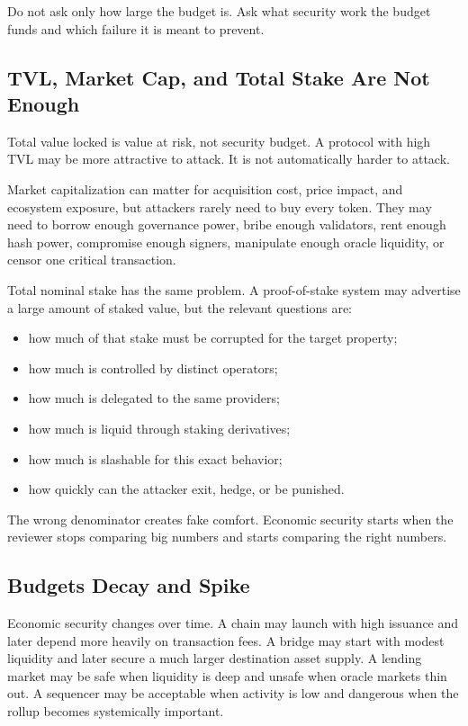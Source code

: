 Do not ask only how large the budget is. Ask what security work the budget funds and which failure it is meant to prevent.

\subsection{TVL, Market Cap, and Total Stake Are Not Enough}

Total value locked is value at risk, not security budget. A protocol with high TVL may be more attractive to attack. It is not automatically harder to attack.

Market capitalization can matter for acquisition cost, price impact, and ecosystem exposure, but attackers rarely need to buy every token. They may need to borrow enough governance power, bribe enough validators, rent enough hash power, compromise enough signers, manipulate enough oracle liquidity, or censor one critical transaction.

Total nominal stake has the same problem. A proof-of-stake system may advertise a large amount of staked value, but the relevant questions are:

\begin{itemize}
\item how much of that stake must be corrupted for the target property;
\item how much is controlled by distinct operators;
\item how much is delegated to the same providers;
\item how much is liquid through staking derivatives;
\item how much is slashable for this exact behavior;
\item how quickly can the attacker exit, hedge, or be punished.
\end{itemize}

The wrong denominator creates fake comfort. Economic security starts when the reviewer stops comparing big numbers and starts comparing the right numbers.

\subsection{Budgets Decay and Spike}

Economic security changes over time. A chain may launch with high issuance and later depend more heavily on transaction fees. A bridge may start with modest liquidity and later secure a much larger destination asset supply. A lending market may be safe when liquidity is deep and unsafe when oracle markets thin out. A sequencer may be acceptable when activity is low and dangerous when the rollup becomes systemically important.

